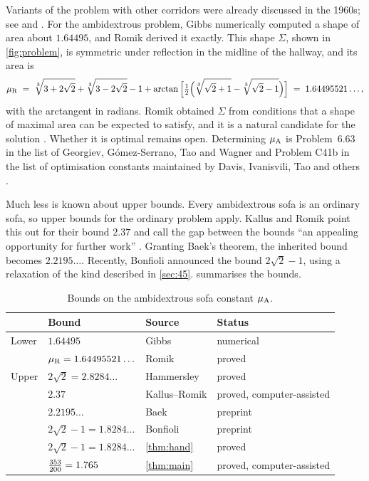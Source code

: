 Variants of the problem with other corridors were already discussed in the 1960s; see \cite[Section~1.2]{romik2018} and \cite{wagner1976}. For the ambidextrous problem, Gibbs \cite{gibbs2014} numerically computed a shape of area about $1.64495$, and Romik \cite{romik2018} derived it exactly. This shape $\Sigma$, shown in \cref{fig:problem}, is symmetric under reflection in the midline of the hallway, and its area is
\[
\mu_{\mathrm{R}} \;=\; \sqrt[3]{3+2\sqrt{2}}+\sqrt[3]{3-2\sqrt{2}}-1+\arctan\Big[\tfrac12\Big(\sqrt[3]{\sqrt2+1}-\sqrt[3]{\sqrt2-1}\Big)\Big] \;=\; 1.64495521\ldots,
\]
with the arctangent in radians. Romik obtained $\Sigma$ from conditions that a shape of maximal area can be expected to satisfy, and it is a natural candidate for the solution \cite{romik2018,kallusromik2018}. Whether it is optimal remains open. Determining $\mu_{\mathrm{A}}$ is Problem~6.63 in the list of Georgiev, G\'omez-Serrano, Tao and Wagner \cite{georgiev2025alphaevolve} and Problem C41b in the list of optimisation constants maintained by Davis, Ivanisvili, Tao and others \cite{optimisation-constants-repo}.

Much less is known about upper bounds. Every ambidextrous sofa is an ordinary sofa, so upper bounds for the ordinary problem apply. Kallus and Romik point this out for their bound $2.37$ and call the gap between the bounds ``an appealing opportunity for further work'' \cite[Section~5]{kallusromik2018}. Granting Baek's theorem, the inherited bound becomes $2.2195\ldots$. Recently, Bonfioli \cite{bonfioli2026} announced the bound $2\sqrt2-1$, using a relaxation of the kind described in \cref{sec:45}.  summarises the bounds.

\begin{table}[t]
\centering
\caption{Bounds on the ambidextrous sofa constant $\mu_{\mathrm{A}}$.}
\label{tab:history}
\begin{tabular}{@{}llll@{}}
\toprule
 & Bound & Source & Status \\
\midrule
Lower & $1.64495$ & Gibbs \cite{gibbs2014} & numerical \\
      & $\mu_{\mathrm{R}}=1.64495521\ldots$ & Romik \cite{romik2018} & proved \\
\midrule
Upper & $2\sqrt2 = 2.8284\ldots$ & Hammersley \cite{hammersley1968} & proved \\
      & $2.37$ & Kallus--Romik \cite{kallusromik2018} & proved, computer-assisted \\
      & $2.2195\ldots$ & Baek \cite{baek2024} & preprint \\
      & $2\sqrt2-1 = 1.8284\ldots$ & Bonfioli \cite{bonfioli2026} & preprint \\
      & $2\sqrt2-1 = 1.8284\ldots$ & \cref{thm:hand} & proved \\
      & $\tfrac{353}{200} = 1.765$ & \cref{thm:main} & proved, computer-assisted \\
\bottomrule
\end{tabular}
\end{table}

